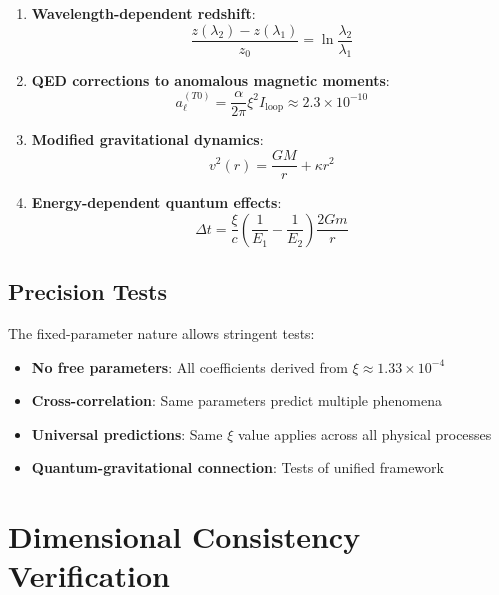 \documentclass[12pt,a4paper]{article}
\newcommand{\xipar}{\xi}
\theoremstyle{definition}
\theoremstyle{remark}
\begin{document}
	\begin{enumerate}
		\item \textbf{Wavelength-dependent redshift}:
		\begin{equation}
			\frac{z(\lambda_2) - z(\lambda_1)}{z_0} = \ln\frac{\lambda_2}{\lambda_1}
			\label{eq:wavelength_test}
		\end{equation}
		
		\item \textbf{QED corrections to anomalous magnetic moments}:
		\begin{equation}
			a_{\ell}^{(T0)} = \frac{\alpha}{2\pi} \xipar^2 I_{\text{loop}} \approx 2.3 \times 10^{-10}
			\label{eq:qed_correction}
		\end{equation}
		
		\item \textbf{Modified gravitational dynamics}:
		\begin{equation}
			v^2(r) = \frac{GM}{r} + \kappa r^2
			\label{eq:rotation_curve_prediction}
		\end{equation}
		
		\item \textbf{Energy-dependent quantum effects}:
		\begin{equation}
			\Delta t = \frac{\xipar}{c} \left(\frac{1}{E_1} - \frac{1}{E_2}\right) \frac{2Gm}{r}
			\label{eq:quantum_time_delay}
		\end{equation}
	\end{enumerate}
	
	\subsection{Precision Tests}
	\label{subsec:precision_tests}
	
	The fixed-parameter nature allows stringent tests:
	\begin{itemize}
		\item \textbf{No free parameters}: All coefficients derived from $\xipar \approx 1.33 \times 10^{-4}$
		\item \textbf{Cross-correlation}: Same parameters predict multiple phenomena
		\item \textbf{Universal predictions}: Same $\xipar$ value applies across all physical processes
		\item \textbf{Quantum-gravitational connection}: Tests of unified framework
	\end{itemize}
	
	\section{Dimensional Consistency Verification}
	\label{sec:dimensional_verification}
	
\end{document}
